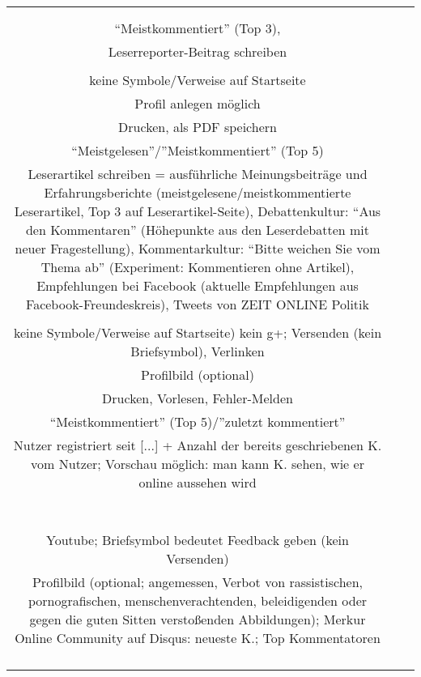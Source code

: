 \begin{landscape}
\begin{tabular}{ccc}
{		\\
		\\
		``Meistkommentiert''  (Top 3), \\
		Leserreporter-Beitrag schreiben \\
		&
		\\
		keine Symbole/Verweise auf Startseite\\
		Profil anlegen möglich\\
		Drucken, als PDF speichern\\
		``Meistgelesen''/''Meistkommentiert'' (Top 5)\\
		Leserartikel schreiben = ausführliche Meinungsbeiträge und Erfahrungsberichte (meistgelesene/meistkommentierte Leserartikel, Top 3 auf Leserartikel-Seite), Debattenkultur: ``Aus den Kommentaren'' (Höhepunkte aus den Leserdebatten mit neuer Fragestellung), Kommentarkultur: ``Bitte weichen Sie vom Thema ab'' (Experiment: Kommentieren ohne Artikel), Empfehlungen bei Facebook (aktuelle Empfehlungen aus Facebook-Freundeskreis), Tweets von ZEIT ONLINE Politik\\
		&
		\\
		keine Symbole/Verweise auf Startseite) kein g+; Versenden (kein Briefsymbol), Verlinken\\
		Profilbild (optional)\\
		Drucken, Vorlesen, Fehler-Melden\\
		``Meistkommentiert'' (Top 5)/''zuletzt kommentiert''\\
		Nutzer registriert seit [...] + Anzahl der bereits geschriebenen K. vom Nutzer; Vorschau möglich: man kann K. sehen, wie er online aussehen wird\\
		&
		\\
		\\
		\\
		\\
		\\
		\\
		&
		\\
		Youtube; Briefsymbol bedeutet Feedback geben (kein Versenden)\\
		Profilbild (optional; angemessen, Verbot von rassistischen, pornografischen, menschenverachtenden, beleidigenden oder gegen die guten Sitten verstoßenden Abbildungen); Merkur Online Community auf Disqus: neueste K.; Top Kommentatoren\\
		\\
		\\
		\\
}
\end{tabular}
\end{landscape}
